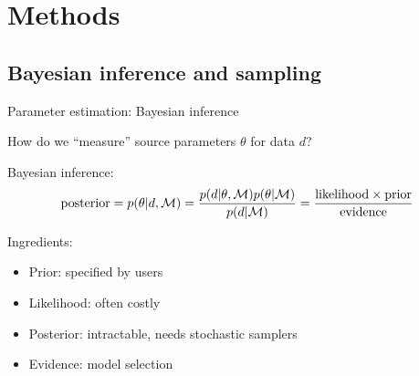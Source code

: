 \documentclass[usenames,dvipsnames,t]{beamer}
\begin{document}
\section{Methods}

\subsection{Bayesian inference and sampling}

\begin{frame}{Parameter estimation: Bayesian inference}

  \def\x{5mm}

  How do we ``measure'' source parameters $\theta$ for data $d$? 

  \vspace{\x}
  
  Bayesian inference:
  \begin{equation*}
    {\rm{posterior}} = p(\theta|d, \mathcal{M}) = \frac{p(d|\theta, \mathcal{M}) p(\theta | \mathcal{M})}{p(d | \mathcal{M})} = \frac{\rm{likelihood} \times \rm{prior}}{\rm{evidence}}
  \end{equation*}

  \vspace{\x}

  Ingredients:
  \begin{itemize}
    \item Prior: specified by users
    
    \item Likelihood: often costly
    
    \item Posterior: intractable, needs stochastic samplers

    \item Evidence: model selection
  \end{itemize}
\end{frame}





\end{document}
